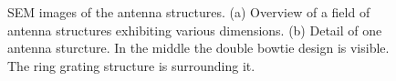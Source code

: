 		\begin{figure}[tp]
			\begin{subfigure}[t]{ 0.49\linewidth}
				\centering
				\caption{}
				\label{subfig::antenna_structures_sem}
			\end{subfigure}
			\hfill
			\begin{subfigure}[t]{ 0.49\linewidth}
				\centering
				\caption{}
				\label{subfig::antenna_one_structure_sem}
			\end{subfigure}
			\caption{SEM images of the antenna structures. (a) Overview of a field of antenna structures exhibiting various dimensions. (b) Detail of one antenna sturcture. In the middle the double bowtie design is visible. The ring grating structure is surrounding it.}
		\end{figure}

